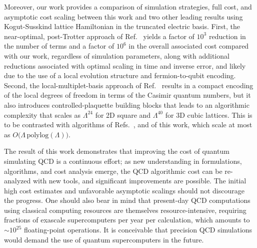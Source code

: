 \documentclass[aps,prd,twocolumn,showpacs,groupedaddress,superscriptaddress,nofootinbib,floatfix,preprintnumbers,longbibliography]{revtex4-1}
\begin{document}
Moreover, our work provides a comparison of simulation strategies, full cost, and asymptotic cost scaling between this work and two other leading results using Kogut-Susskind lattice Hamiltonian in the truncated electric basis. First, the near-optimal, post-Trotter approach of Ref.~\cite{Rhodes:2024zbr} yields a factor of $10^3$ reduction in the number of terms and a factor of $10^6$ in the overall associated cost compared with our work, regardless of simulation parameters, along with additional reductions associated with optimal scaling in time and inverse error, and likely due to the use of a local evolution structure and fermion-to-qubit encoding. Second, the local-multiplet-basis approach of Ref.~\cite{Ciavarella:2021nmj} results in a compact encoding of the local degrees of freedom in terms of the Casimir quantum numbers, but it also introduces controlled-plaquette building blocks that leads to an algorithmic complexity that scales as $\Lambda^{24}$ for 2D square and $\Lambda^{40}$ for 3D cubic lattices. This is to be contrasted with algorithms of Refs.~\cite{Kan:2021xfc,Davoudi:2022xmb}, and of this work, which scale at most as ${O}\big(\Lambda\,\text{polylog}(\Lambda)\big)$.

The result of this work demonstrates that improving the cost of quantum simulating QCD is a continuous effort; as new understanding in formulations, algorithms, and cost analysis emerge, the QCD algorithmic cost can be re-analyzed with new tools, and significant improvements are possible. The initial high cost estimates and unfavorable asymptotic scalings should not discourage the progress. One should also bear in mind that present-day QCD computations using classical computing resources are themselves resource-intensive, requiring fractions of exascale supercomputers per year per calculation, which amounts to $\sim 10^{25}$ floating-point operations. It is conceivable that precision QCD simulations would demand the use of quantum supercomputers in the future.
\end{document}
